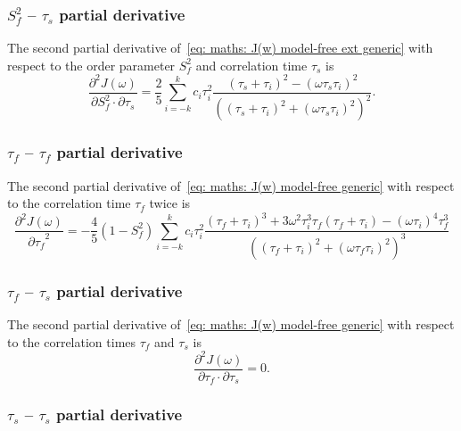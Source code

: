 \subsubsection{$S^2_f$ -- $\tau_s$ partial derivative}

The second partial derivative of~\eqref{eq: maths: J(w) model-free ext generic} with respect to the order parameter $S^2_f$ and correlation time $\tau_s$ is
\begin{equation}
    \frac{\partial^2 J(\omega)}{\partial S^2_f \cdot \partial \tau_s} = \frac{2}{5} \sum_{i=-k}^k c_i \tau_i^2
        \frac{(\tau_s + \tau_i)^2 - (\omega \tau_s \tau_i)^2}{\left((\tau_s + \tau_i)^2 + (\omega \tau_s \tau_i)^2 \right)^2}.
\end{equation}



\subsubsection{$\tau_f$ -- $\tau_f$ partial derivative}

The second partial derivative of~\eqref{eq: maths: J(w) model-free generic} with respect to the correlation time $\tau_f$ twice is
\begin{equation}
    \frac{\partial^2 J(\omega)}{{\partial \tau_f}^2} = -\frac{4}{5} (1 - S^2_f) \sum_{i=-k}^k c_i \tau_i^2
        \frac{(\tau_f + \tau_i)^3  +  3 \omega^2 \tau_i^3 \tau_f (\tau_f + \tau_i)  -  (\omega \tau_i)^4 \tau_f^3}
            {\left((\tau_f + \tau_i)^2 + (\omega \tau_f \tau_i)^2 \right)^3}
\end{equation}



\subsubsection{$\tau_f$ -- $\tau_s$ partial derivative}

The second partial derivative of~\eqref{eq: maths: J(w) model-free generic} with respect to the correlation times $\tau_f$ and $\tau_s$ is
\begin{equation}
    \frac{\partial^2 J(\omega)}{\partial \tau_f \cdot \partial \tau_s} = 0.
\end{equation}



\subsubsection{$\tau_s$ -- $\tau_s$ partial derivative}

